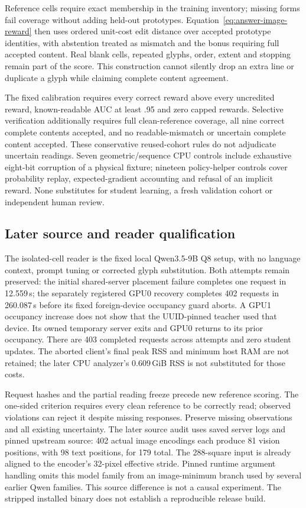 \documentclass[12pt,a4paper]{article}
\providecommand{\DIFadd}[1]{{\protect\color{blue} \sf #1}} %
\begin{document}
\DIFadd{Reference cells require exact membership in the training inventory; missing
forms fail coverage without adding held-out prototypes. Equation~\ref{eq:answer-image-reward}
then uses ordered unit-cost edit distance over accepted prototype identities,
with abstention treated as mismatch and the bonus requiring full accepted
content. Real blank cells, repeated glyphs, order, extent and stopping remain
part of the score. This construction cannot silently drop an extra line or
duplicate a glyph while claiming complete content agreement.
}

\DIFadd{The fixed calibration requires every correct reward above every uncredited
reward, known-readable AUC at least .95 and zero capped rewards. Selective
verification additionally requires full clean-reference coverage, all nine
correct complete contents accepted, and no readable-mismatch or uncertain
complete content accepted. These conservative reused-cohort rules do not
adjudicate uncertain readings. Seven geometric/sequence CPU controls include
exhaustive eight-bit corruption of a physical fixture; nineteen policy-helper
controls cover probability replay, expected-gradient accounting and refusal of
an implicit reward. None substitutes for student learning, a fresh validation
cohort or independent human review.
}

\subsection*{\DIFadd{Later source and reader qualification}}

\DIFadd{The isolated-cell reader is the fixed local Qwen3.5-9B Q8 setup, with no language
context, prompt tuning or corrected glyph substitution. Both attempts remain
preserved: the initial shared-server placement failure completes one request in
12.559\,s; the separately registered GPU0 recovery completes 402 requests in
260.087\,s before its fixed foreign-device occupancy guard aborts. A GPU1
occupancy increase does not show that the UUID-pinned teacher used that device.
Its owned temporary server exits and GPU0 returns to its prior occupancy.
There are 403 completed requests across attempts and zero student updates.
The aborted client's final peak RSS and minimum host RAM are not retained;
the later CPU analyzer's 0.609\,GiB RSS is not substituted for those costs.
}

\DIFadd{Request hashes and the partial reading freeze precede new reference scoring.
The one-sided criterion requires every clean reference to be correctly read;
observed violations can reject it despite missing responses. Preserve missing
observations and all existing uncertainty. The later source audit uses saved
server logs and pinned upstream source: 402 actual image encodings each produce
81 vision positions, with 98 text positions, for 179 total. The 288-square input
is already aligned to the encoder's 32-pixel effective stride. Pinned runtime
argument handling omits this model family from an image-minimum branch used by
several earlier Qwen families. This source difference is not a causal experiment.
The stripped installed binary does not establish a reproducible release build.
}
\end{document}
